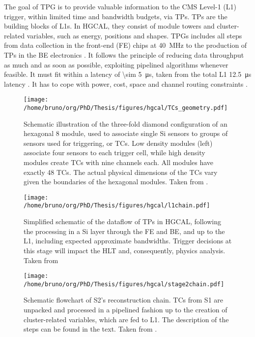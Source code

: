 \documentclass[11pt]{article}
\begin{document}
The goal of \ac{TPG} is to provide valuable information to the CMS Level-1 (L1) trigger, within limited time and bandwidth budgets, via \acp{TP}.
\acp{TP} are the building blocks of \acp{L1}.
In HGCAL, they consist of module towers and cluster-related variables, such as energy, positions and shapes.
\acp{TPG} includes all steps from data collection in the front-end (FE) chips at \SI{40}{\mega\hertz} to the production of \acp{TP} in the \ac{BE} electronics \cite{hgcalTDR}.
It follows the principle of reducing data throughput as much and as soon as possible, exploiting pipelined algorithms whenever feasible.
It must fit within a latency of \SI{\sim 5}{\micro\second}, taken from the total L1 \SI{12.5}{\micro\second} latency \cite{l1TDR}.
It has to cope with power, cost, space and channel routing constraints \cite{jb_hdr}.

\begin{figure}
\texttt{[image: /home/bruno/org/PhD/Thesis/figures/hgcal/TCs\_geometry.pdf]}
\caption{\label{fig:tcs_geometry}Schematic illustration of the three-fold diamond configuration of an hexagonal \SI{8}{\inch} module, used to associate single \ac{Si} sensors to groups of sensors used for triggering, or \acp{TC}. Low density modules (left) associate four sensors to each trigger cell, while high density modules create \acp{TC} with nine channels each. All modules have exactly \num{48} \acp{TC}. The actual physical dimensions of the \acp{TC} vary given the boundaries of the hexagonal modules. Taken from \cite{hgcalTDR}.}
\end{figure}

\begin{figure}
\begin{center}
\texttt{[image: /home/bruno/org/PhD/Thesis/figures/hgcal/l1chain.pdf]}
\end{center}
\caption{\label{fig:l1chain}Simplified schematic of the dataflow of \acp{TP} in HGCAL, following the processing in a Si layer through the \ac{FE} and \ac{BE}, and up to the \ac{L1}, including expected approximate bandwidths. Trigger decisions at this stage will impact the \ac{HLT} and, consequently, physics analysis. Taken from \cite{bruno_chep23}}
\end{figure}

\begin{figure}
\begin{center}
\texttt{[image: /home/bruno/org/PhD/Thesis/figures/hgcal/stage2chain.pdf]}
\end{center}
\caption{\label{fig:stage2chain}Schematic flowchart of S2’s reconstruction chain. TCs from S1 are unpacked and processed in a pipelined fashion up to the creation of cluster-related variables, which are fed to L1. The description of the steps can be found in the text. Taken from \cite{bruno_chep23}.}
\end{figure}
\end{document}
